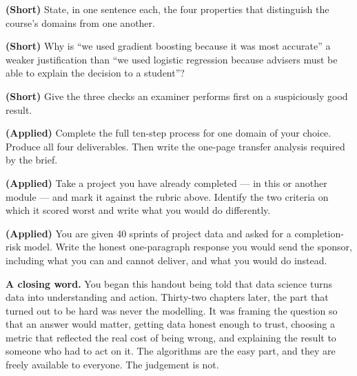 \begin{reviewq}
  \item \textbf{(Short)} State, in one sentence each, the four properties that
        distinguish the course's domains from one another.
  \item \textbf{(Short)} Why is ``we used gradient boosting because it was most
        accurate'' a weaker justification than ``we used logistic regression because
        advisers must be able to explain the decision to a student''?
  \item \textbf{(Short)} Give the three checks an examiner performs first on a
        suspiciously good result.
  \item \textbf{(Applied)} Complete the full ten-step process for one domain of your
        choice. Produce all four deliverables. Then write the one-page transfer
        analysis required by the brief.
  \item \textbf{(Applied)} Take a project you have already completed --- in this or
        another module --- and mark it against the rubric above. Identify the two
        criteria on which it scored worst and write what you would do differently.
  \item \textbf{(Applied)} You are given 40 sprints of project data and asked for a
        completion-risk model. Write the honest one-paragraph response you would send
        the sponsor, including what you can and cannot deliver, and what you would do
        instead.
\end{reviewq}

\begin{center}
\vspace{6pt}
\begin{tcolorbox}[enhanced, width=0.94\textwidth, colback=primary!5,
  colframe=primary, boxrule=0pt, leftrule=5pt, arc=3pt, top=8pt, bottom=8pt]
\small
\textbf{\color{primary}A closing word.} You began this handout being told that data
science turns data into understanding and action. Thirty-two chapters later, the
part that turned out to be hard was never the modelling. It was framing the question
so that an answer would matter, getting data honest enough to trust, choosing a
metric that reflected the real cost of being wrong, and explaining the result to
someone who had to act on it. The algorithms are the easy part, and they are
freely available to everyone. The judgement is not.
\end{tcolorbox}
\end{center}

